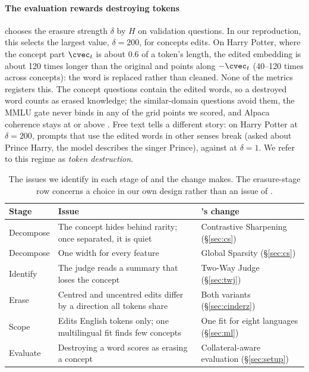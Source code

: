 \paragraph{The evaluation rewards destroying tokens}
\ember{} chooses the erasure strength $\delta$ by $H$ on validation questions.
In our reproduction, this selects the largest value, $\delta = 200$, for  concepts \ember{} edits.
On Harry Potter, where the concept part $\cvec_t$ is about 0.6 of a token's length, the edited embedding is about 120 times longer than the original and points along $-\cvec_t$ (40--120 times across concepts): the word is replaced rather than cleaned.
None of the metrics registers this.
The concept questions contain the edited words, so a destroyed word counts as erased knowledge; the similar-domain questions avoid them, the MMLU gate never binds in any of the  grid points we scored, and Alpaca coherence stays at or above .
Free text tells a different story: on Harry Potter at $\delta = 200$,  prompts that use the edited words in other senses break (asked about Prince Harry, the model describes the singer Prince), against  at $\delta = 1$.
We refer to this regime as \emph{token destruction}.

\begin{table}[t]
  \centering
  \small
  \setlength{\tabcolsep}{3pt}
  \begin{tabular}{@{}P{1.45cm}P{3.15cm}P{2.3cm}@{}}
    \toprule
    Stage & Issue & \cinder{}'s change \\
    \midrule
    Decompose & The concept hides behind rarity; once separated, it is quiet & Contrastive Sharpening (\S\ref{sec:cs}) \\
    Decompose & One width for every feature & Global Sparsity (\S\ref{sec:cs}) \\
    Identify & The judge reads a summary that loses the concept & Two-Way Judge (\S\ref{sec:twj}) \\
    Erase & Centred and uncentred edits differ by a direction all tokens share & Both variants (\S\ref{sec:cinderz}) \\
    Scope & Edits English tokens only; one multilingual fit finds few concepts & One fit for eight languages (\S\ref{sec:ml}) \\
    Evaluate & Destroying a word scores as erasing a concept & Collateral-aware evaluation (\S\ref{sec:setup}) \\
    \bottomrule
  \end{tabular}
  \caption{The issues we identify in each stage of \ember{} and the change \cinder{} makes. The erasure-stage row concerns a choice in our own design rather than an issue of \ember{}.}
  \label{tab:diagnosis}
\end{table}

